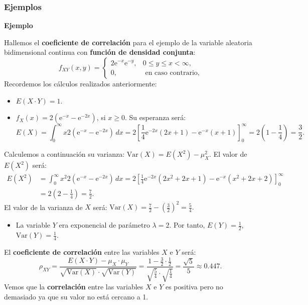 \documentclass[]{book}
\providecommand{\tightlist}{%
  \setlength{\itemsep}{0pt}\setlength{\parskip}{0pt}}
\begin{document}
\hypertarget{ejemplos-8}{%
\subsubsection{Ejemplos}\label{ejemplos-8}}

\textbf{Ejemplo}

Hallemos el \textbf{coeficiente de correlación} para el ejemplo de la variable aleatoria bidimensional continua con \textbf{función de densidad conjunta}:
\[
f_{XY}(x,y)=\begin{cases}
2 \mathrm{e}^{-x}\mathrm{e}^{-y}, & 0\leq y\leq x < \infty,\\
0, & \mbox{ en caso contrario,}
\end{cases}
\]
Recordemos los cálculos realizados anteriormente:

\begin{itemize}
\item
  \(E(X\cdot Y)=1.\)
\item
  \(f_X(x)=2\left(\mathrm{e}^{-x}-\mathrm{e}^{-2x}\right)\), si \(x\geq 0\). Su esperanza será:
  \[
  E(X)=\int_0^\infty x 2\left(\mathrm{e}^{-x}-\mathrm{e}^{-2x}\right)\, dx=2 \left[\frac{1}{4} \mathrm{e}^{-2 x} (2 x+1)-\mathrm{e}^{-x}(x+1)\right]_0^\infty = 2\left(1-\frac{1}{4}\right)=\frac{3}{2}.
  \]
\end{itemize}

Calculemos a continuación su varianza: \(\mathrm{Var}(X)=E\left(X^2\right)-\mu_X^2\). El valor de \(E\left(X^2\right)\) será:
\[
\begin{array}{rl}
E\left(X^2\right) & =\int_0^\infty x^2 2\left(\mathrm{e}^{-x}-\mathrm{e}^{-2x}\right)\, dx=2 \left[\frac{1}{4} \mathrm{e}^{-2 x}  (2x^2+2x+1)- \mathrm{e}^{-x} (x^2+2x+2)\right]_0^\infty \\ & = 2\left(2-\frac{1}{4}\right)=\frac{7}{2}.
\end{array}
\]
El valor de la varianza de \(X\) será: \(\mathrm{Var}(X)=\frac{7}{2}-\left(\frac{3}{2}\right)^2 = \frac{5}{4}.\)

\begin{itemize}
\tightlist
\item
  La variable \(Y\) era exponencial de parámetro \(\lambda =2\). Por tanto, \(E(Y)=\frac{1}{2}\), \(\mathrm{Var}(Y)=\frac{1}{4}\).
\end{itemize}

El \textbf{coeficiente de correlación} entre las variables \(X\) e \(Y\) será:
\[
\rho_{XY}=\frac{E(X\cdot Y)-\mu_X\cdot \mu_Y}{\sqrt{\mathrm{Var}(X)}\cdot\sqrt{\mathrm{Var}(Y)}}=\frac{1-\frac{3}{2}\cdot \frac{1}{2}}{\sqrt{\frac{5}{4}}\cdot\sqrt{\frac{1}{4}}}=\frac{\sqrt{5}}{5}\approx 0.447.
\]
Vemos que la \textbf{correlación} entre las variables \(X\) e \(Y\) es positiva pero no demasiado ya que su valor no está cercano a 1.
\end{document}
